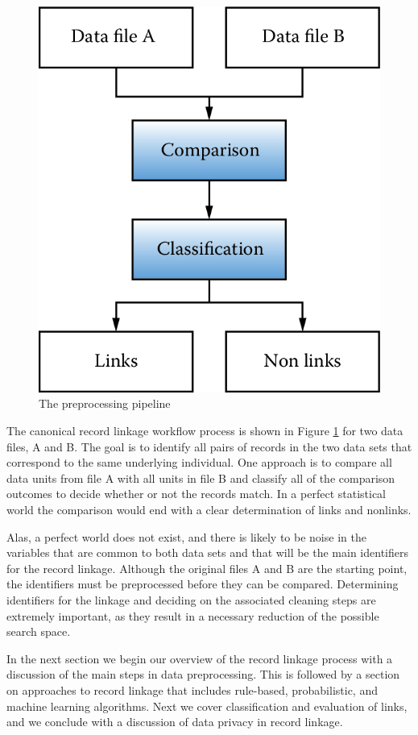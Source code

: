 \documentclass[]{krantz}
\begin{document}
\begin{figure}

{\centering \includegraphics[width=0.7\linewidth]{ChapterLinkage/figures/fig3-1} 

}

\caption{The preprocessing pipeline}\label{fig:fig3-1}
\end{figure}

The canonical record linkage workflow process is shown in Figure
\ref{fig:fig3-1} for two data files, A and B. The goal is to identify
all pairs of records in the two data sets that correspond to the same
underlying individual. One approach is to compare all data units from
file A with all units in file B and classify all of the comparison
outcomes to decide whether or not the records match. In a perfect
statistical world the comparison would end with a clear determination of
links and nonlinks.

Alas, a perfect world does not exist, and there is likely to be noise in
the variables that are common to both data sets and that will be the
main identifiers for the record linkage. Although the original files A
and B are the starting point, the identifiers must be preprocessed
before they can be compared. Determining identifiers for the linkage and
deciding on the associated cleaning steps are extremely important, as
they result in a necessary reduction of the possible search space.

In the next section we begin our overview of the record linkage process
with a discussion of the main steps in data preprocessing. This is
followed by a section on approaches to record linkage that includes
rule-based, probabilistic, and machine learning algorithms. Next we
cover classification and evaluation of links, and we conclude with a
discussion of data privacy in record linkage.
\end{document}
